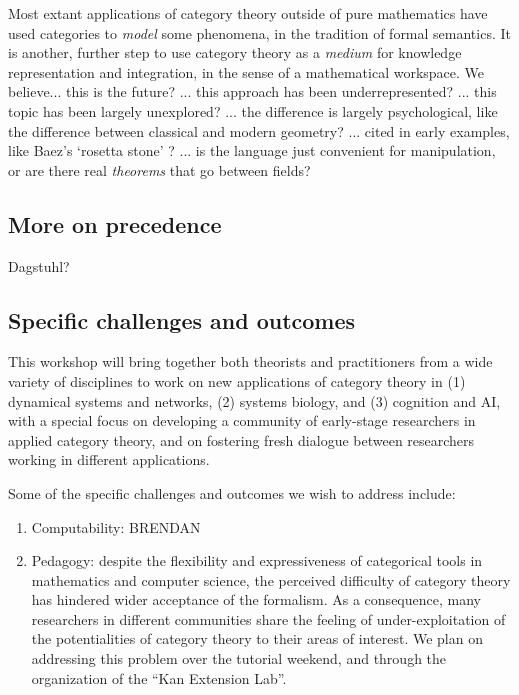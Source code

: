 \documentclass{article}
\newcommand{\redout}[1]{{\color{red}#1}}
\begin{document}
Most extant applications of category theory outside of pure mathematics have used categories to \emph{model} some phenomena, in the tradition of formal semantics. It is another, further step to use category theory as a \emph{medium} for knowledge representation and integration, in the sense of a mathematical workspace. \redout{We believe... this is the future? ... this approach has been underrepresented? ... this topic has been largely unexplored? ... the difference is largely psychological, like the difference between classical and modern geometry? ... cited in early examples, like Baez's `rosetta stone' \cite{baez_rosetta}? ... is the language just convenient for manipulation, or are there real \emph{theorems} that go between fields?}



\subsection{More on precedence}
Dagstuhl?

\subsection{Specific challenges and outcomes}
This workshop will bring together both theorists and practitioners from a wide variety of disciplines to work on new applications of category theory in (1) dynamical systems and networks, (2) systems biology, and (3) cognition and AI, with a special focus on developing a community of early-stage researchers in applied category theory, and on fostering fresh dialogue between researchers working in different applications.

Some of the specific challenges and outcomes we wish to address include:
\begin{enumerate}
\item Computability: \redout{BRENDAN}
\item Pedagogy: despite the flexibility and expressiveness of categorical tools in mathematics and computer science, the perceived difficulty of category theory has hindered wider acceptance of the formalism. As a consequence, many researchers in different communities share the feeling of under-exploitation of the potentialities of category theory to their areas of interest. We plan on addressing this problem over the tutorial weekend, and through the organization of the ``Kan Extension Lab''.
\end{enumerate}
\end{document}
